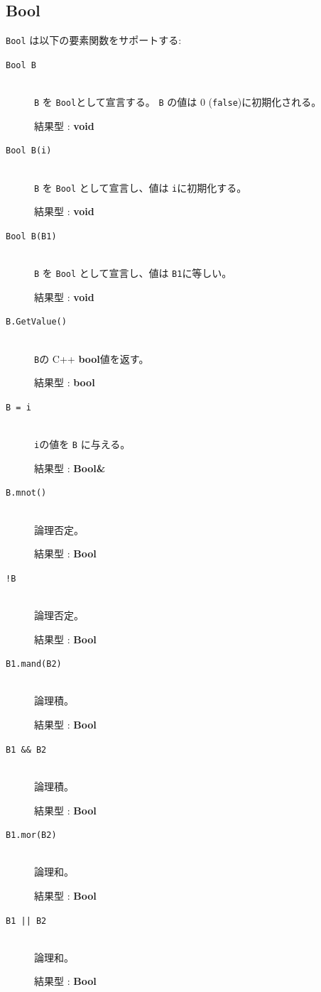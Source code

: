 \documentclass[\pformat,12pt]{jarticle}
\begin{document}
\subsection{Bool}
{\tt Bool} は以下の要素関数をサポートする:

\vspace{0.5cm}

\begin{description}
\item[{\tt Bool B}] \mbox{}\\
      {\tt B} を {\tt Bool}として宣言する。 {\tt B} の値は 0 ({\tt false})に初期化される。 

     結果型 : {\bf void}

\item[{\tt Bool B(i)}] \mbox{}\\
     {\tt B} を {\tt Bool} として宣言し、値は {\tt i}に初期化する。

     結果型 : {\bf void}

\item[{\tt Bool B(B1)}] \mbox{}\\
     {\tt B} を {\tt Bool} として宣言し、値は {\tt B1}に等しい。

     結果型 : {\bf void}

\item[{\tt B.GetValue()}] \mbox{}\\
     {\tt B}の C++ {\bf bool}値を返す。

     結果型 : {\bf bool}

\item[{\tt B = i}] \mbox{}\\
     {\tt i}の値を {\tt B} に与える。

     結果型 : {\bf Bool\&}

\item[{\tt B.mnot()}] \mbox{}\\
     論理否定。

     結果型 : {\bf Bool}

\item[{\tt !B}] \mbox{}\\
     論理否定。

     結果型 : {\bf Bool}

\item[{\tt B1.mand(B2)}] \mbox{}\\
     論理積。

     結果型 : {\bf Bool}

\item[{\tt B1 \&\& B2}] \mbox{}\\
     論理積。

     結果型 : {\bf Bool}

\item[{\tt B1.mor(B2)}] \mbox{}\\
     論理和。

     結果型 : {\bf Bool}

\item[{\tt B1 || B2}] \mbox{}\\
     論理和。

     結果型 : {\bf Bool}

\end{description}
\end{document}
